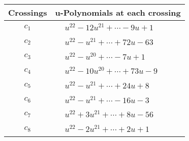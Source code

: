 \documentclass[1p]{elsarticle_modified}
\theoremstyle{definition}
\begin{document}
\begin{tabular}{m{50pt}|m{274pt}}
Crossings & \hspace{64pt}u-Polynomials at each crossing \\
\hline $$\begin{aligned}c_{1}\end{aligned}$$&$\begin{aligned}
&u^{22}-12 u^{21}+\cdots-9 u+1
\end{aligned}$\\
\hline $$\begin{aligned}c_{2}\end{aligned}$$&$\begin{aligned}
&u^{22}- u^{21}+\cdots+72 u-63
\end{aligned}$\\
\hline $$\begin{aligned}c_{3}\end{aligned}$$&$\begin{aligned}
&u^{22}- u^{20}+\cdots-7 u+1
\end{aligned}$\\
\hline $$\begin{aligned}c_{4}\end{aligned}$$&$\begin{aligned}
&u^{22}-10 u^{20}+\cdots+73 u-9
\end{aligned}$\\
\hline $$\begin{aligned}c_{5}\end{aligned}$$&$\begin{aligned}
&u^{22}- u^{21}+\cdots+24 u+8
\end{aligned}$\\
\hline $$\begin{aligned}c_{6}\end{aligned}$$&$\begin{aligned}
&u^{22}- u^{21}+\cdots-16 u-3
\end{aligned}$\\
\hline $$\begin{aligned}c_{7}\end{aligned}$$&$\begin{aligned}
&u^{22}+3 u^{21}+\cdots+8 u-56
\end{aligned}$\\
\hline $$\begin{aligned}c_{8}\end{aligned}$$&$\begin{aligned}
&u^{22}-2 u^{21}+\cdots+2 u+1
\end{aligned}$\\

\end{tabular}
\end{document}
